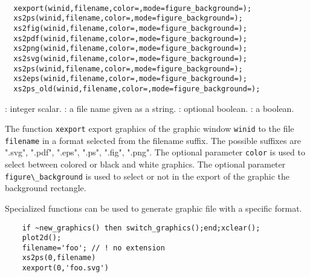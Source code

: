 
\begin{mandesc}
  \\ %
\end{mandesc}
\begin{calling_sequence}
\begin{verbatim}
  xexport(winid,filename,color=,mode=figure_background=);
  xs2ps(winid,filename,color=,mode=figure_background=);
  xs2fig(winid,filename,color=,mode=figure_background=);
  xs2pdf(winid,filename,color=,mode=figure_background=);
  xs2png(winid,filename,color=,mode=figure_background=);
  xs2svg(winid,filename,color=,mode=figure_background=);
  xs2ps(winid,filename,color=,mode=figure_background=);
  xs2eps(winid,filename,color=,mode=figure_background=);
  xs2ps_old(winid,filename,color=,mode=figure_background=);
\end{verbatim}
\end{calling_sequence}
\begin{parameters}
  \begin{varlist}
    : integer scalar.
    : a file name given as a string.
    : optional boolean. 
    : a boolean. 
  \end{varlist}
\end{parameters}
\begin{mandescription}
  The function \verb!xexport! export graphics of the graphic window \verb!winid! to 
  the file \verb!filename! in a format selected from the filename suffix. 
  The possible suffixes are ".svg", ".pdf", ".eps", ".ps", ".fig", ".png". 
  The optional parameter \verb!color! is used to select between colored or black and 
  white graphics. The optional parameter \verb!figure\_background! is used to select 
  or not in the export of the graphic the background rectangle. 

  Specialized functions can be used to generate graphic file with a specific format. 
\end{mandescription}
\begin{examples}
  \begin{Verbatim} 
    if ~new_graphics() then switch_graphics();end;xclear();
    plot2d();
    filename='foo'; // ! no extension
    xs2ps(0,filename)
    xexport(0,'foo.svg')
  \end{Verbatim}
\end{examples}


